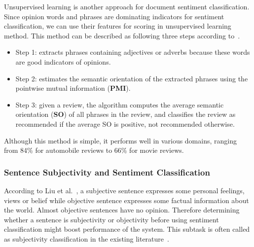\documentclass{article}
\begin{document}
Unsupervised learning is another approach for document sentiment classification. 
Since opinion words and phrases are dominating indicators for sentiment classification, we can use their features for scoring in unsupervised learning method.
This method can be described as following three steps according to~\cite{DBLP:journals/corr/cs-LG-0212032}.
\begin{itemize}
    \item Step 1: extracts phrases containing adjectives or adverbs because these words are good indicators of opinions.
    \item Step 2: estimates the semantic orientation of the extracted phrases using the pointwise mutual information (\textbf{PMI}).
    \item Step 3: given a review, the algorithm computes the average semantic orientation (\textbf{SO}) of all phrases in the review, and classifies the review as recommended if the average SO is positive, not recommended otherwise.
\end{itemize}
Although this method is simple, it performs well in various domains, ranging from 84\% for automobile reviews to 66\% for movie reviews.

\subsubsection{Sentence Subjectivity and Sentiment Classification}
According to Liu et al.~\cite{Liu2012}, a subjective sentence expresses some personal feelings, views or belief while objective sentence expresses some factual information about the world.
Almost objective sentences have no opinion.
Therefore determining whether a sentence is subjectivity or objectivity before using sentiment classification might boost  performance of the system.
This subtask is often called as subjectivity classification in the existing literature~\cite{Hatzivassiloglou:2000:EAO:990820.990864, Pang:2005:SSE:1219840.1219855, Pang:2002:TUS:1118693.1118704, Wiebe:2004:LSL:1105596.1105598, Wilson:2004:JMY:1597148.1597270, COIN:COIN275, Yu:2003:TAO:1119355.1119372}. 
\end{document}
